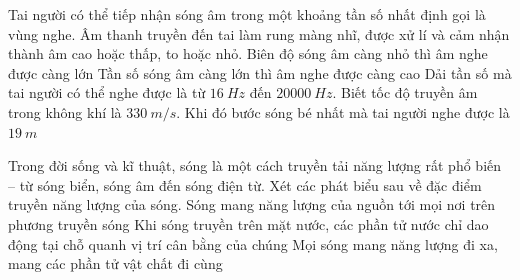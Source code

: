  	\begin{ex}
 	Tai người có thể tiếp nhận sóng âm trong một khoảng tần số nhất định gọi là vùng nghe. Âm thanh truyền đến tai làm rung màng nhĩ, được xử lí và cảm nhận thành âm cao hoặc thấp, to hoặc nhỏ.
 	{Biên độ sóng âm càng nhỏ thì âm nghe được càng lớn}
 	{\True Tần số sóng âm càng lớn thì âm nghe được càng cao}
 	{Dải tần số mà tai người có thể nghe được là từ $16 ~Hz$ đến $20000 ~Hz$. Biết tốc độ truyền âm trong không khí là $330 ~m/s$. Khi đó bước sóng bé nhất mà tai người nghe được là $19 ~m$}
 	\loigiai{
 		\begin{itemchoice}
 			\itemch
 			\itemch
 			\itemch
 			\itemch
 		\end{itemchoice}
 	}
 \end{ex} 
 	\begin{ex}
 		Trong đời sống và kĩ thuật, sóng là một cách truyền tải năng lượng rất phổ biến – từ sóng biển, sóng âm đến sóng điện từ. Xét các phát biểu sau về đặc điểm truyền năng lượng của sóng.
 		{\True Sóng mang năng lượng của nguồn tới mọi nơi trên phương truyền sóng}
 		{\True Khi sóng truyền trên mặt nước, các phần tử nước chỉ dao động tại chỗ quanh vị trí cân bằng của chúng}
 		{Mọi sóng mang năng lượng đi xa, mang các phần tử vật chất đi cùng}
 	\end{ex} 





